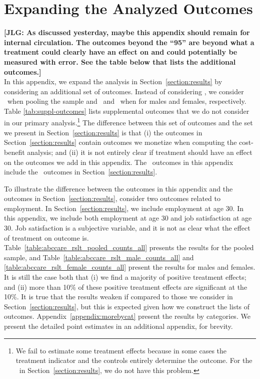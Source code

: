 \section{{Expanding the Analyzed Outcomes}} \label{appendix:moreoutcomes}

\noindent \textbf{[JLG: As discussed yesterday, maybe this appendix should remain for internal circulation. The outcomes beyond the ``95'' are beyond what a treatment could clearly have an effect on and could potentially be measured with error. See the table below that lists the additional outcomes.]} \\

\noindent In this appendix, we expand the analysis in Section~\ref{section:results} by considering an additional set of outcomes. Instead of considering \noutcomes, we consider \noutcomesexpp\ when pooling the sample and \noutcomesexpm\ and \noutcomesexpf\ when for males and females, respectively. Table \ref{tab:suppl-outcomes} lists supplemental outcomes that we do not consider in our primary analysis.\footnote{We fail to estimate some treatment effects because in some cases the treatment indicator and the controls entirely determine the outcome. For the \noutcomes\ in Section~\ref{section:results}, we do not have this problem.} The difference between this set of outcomes and the set we present in Section~\ref{section:results} is that (i) the outcomes in Section~\ref{section:results} contain outcomes we monetize when computing the cost-benefit analysis; and (ii) it is not entirely clear if treatment should have an effect on the outcomes we add in this appendix. The \noutcomes\ outcomes in this appendix include the \noutcomes\ outcomes in Section~\ref{section:results}.\\

\singlespacing

\doublespacing

\noindent To illustrate the difference between the outcomes in this appendix and the outcomes in Section~\ref{section:results}, consider two outcomes related to employment. In Section~\ref{section:results}, we include employment at age 30. In this appendix, we include both employment at age 30 and job satisfaction at age 30. Job satisfaction is a subjective variable, and it is not as clear what the effect of treatment on outcome is.\\

\noindent Table~\ref{table:abccare_rslt_pooled_counts_all} presents the results for the pooled sample, and Table~\ref{table:abccare_rslt_male_counts_all} and \ref{table:abccare_rslt_female_counts_all} present the results for males and females. It is still the case both that (i) we find a majority of positive treatment effects; and (ii) more than 10\% of these positive treatment effects are significant at the 10\%. It is true that the results weaken if compared to those we consider in Section~\ref{section:results}, but this is expected given how we construct the lists of outcomes. Appendix~\ref{appendix:morebycat} present the results by categories. We present the detailed point estimates in an additional appendix, for brevity.

